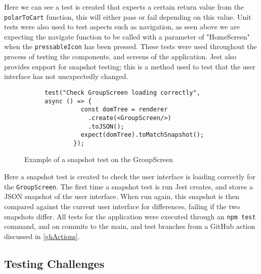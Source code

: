 Here we can see a test is created that expects a certain return value from the \texttt{polarToCart} function, this will either pass or fail depending on this value. Unit tests were also used to test aspects such as navigation, as seen above we are expecting the navigate function to be called with a parameter of "HomeScreen" when the \texttt{pressableIcon} has been pressed. These tests were used throughout the process of testing the components, and screens of the application. Jest also provides support for snapshot testing; this is a method used to test that the user interface has not unexpectedly changed. 

\begin{figure}[!htbp]
    \centering
    \begin{subfigure}[b]{0.8\textwidth}
        \begin{lstlisting}[language=jsJsx]
        test("Check GroupScreen loading correctly", async () => {
          const domTree = renderer
            .create(<GroupScreen/>)
            .toJSON();
          expect(domTree).toMatchSnapshot();
        });
        \end{lstlisting}
    \end{subfigure}
\caption{Example of a snapshot test on the GroupScreen}
\label{fig:jestSnap}
\end{figure}
\FloatBarrier

Here a snapshot test is created to check the user interface is loading correctly for the \texttt{GroupScreen}. The first time a snapshot test is run Jest creates, and stores a JSON snapshot of the user interface. When run again, this snapshot is then compared against the current user interface for differences, failing if the two snapshots differ. All tests for the application were executed through an \texttt{npm test} command, and on commits to the main, and test branches from a GitHub action discussed in \ref{ghActions}.

\subsection{Testing Challenges}\label{testChall}

